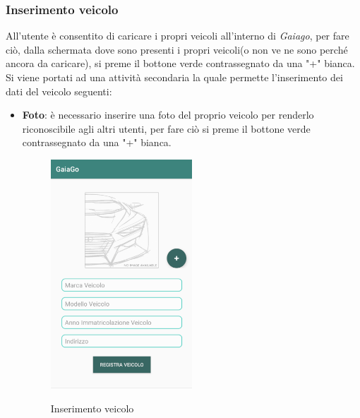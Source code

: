 \subsubsection{Inserimento veicolo}
All'utente è consentito di caricare i propri veicoli all'interno di \textit{Gaiago}, per fare ciò, dalla schermata dove sono presenti i propri veicoli(o non ve ne sono perché ancora da caricare), si preme il bottone verde contrassegnato da una "+" bianca.
Si viene portati ad una attività secondaria la quale permette l'inserimento dei dati del veicolo seguenti:
\begin{itemize}
	\item \textbf{Foto}: è necessario inserire una foto del proprio veicolo per renderlo riconoscibile agli altri utenti, per fare ciò si preme il bottone verde contrassegnato da una "+" bianca.
	 \begin{figure}[H] 
		\centering 
		\includegraphics[width=0.5\textwidth]{res/images/caricamento_veicolo.png}\\
		\caption{Inserimento veicolo}
		\label{ins}
	\end{figure}
\pagebreak


\end{itemize}

